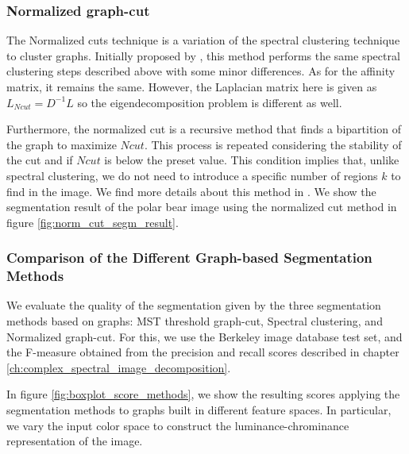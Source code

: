 \documentclass[journal]{IEEEtran}
\begin{document}
\subsubsection{Normalized graph-cut}
The Normalized cuts technique is a variation of the spectral clustering technique to cluster graphs. Initially proposed by \cite{JianboShi.Malik:PAMI:2000}, this method performs the same spectral clustering steps described above with some minor differences. As for the affinity matrix, it remains the same. However, the Laplacian matrix here is given as
$L_{Ncut} = D^{-1}L$
so the eigendecomposition problem is different as well.

Furthermore, the normalized cut is a recursive method that finds a bipartition of the graph to maximize $Ncut$. This process is repeated considering the stability of the cut and if $Ncut$ is below the preset value. This condition implies that, unlike spectral clustering, we do not need to introduce a specific number of regions $k$ to find in the image. We find more details about this method in \cite{JianboShi.Malik:PAMI:2000}. We show the segmentation result of the polar bear image using the normalized cut method in figure \ref{fig:norm_cut_segm_result}. 

\subsubsection{Comparison of the Different Graph-based Segmentation Methods}
We evaluate the quality of the segmentation given by the three segmentation methods based on graphs: MST threshold graph-cut, Spectral clustering, and Normalized graph-cut.  For this, we use the Berkeley image database test set, and the F-measure obtained from the precision and recall scores described in chapter \ref{ch:complex_spectral_image_decomposition}. 

In figure \ref{fig:boxplot_score_methods}, we show the resulting scores applying the segmentation methods to graphs built in different feature spaces. In particular, we vary the input color space to construct the luminance-chrominance representation of the image.
\end{document}
